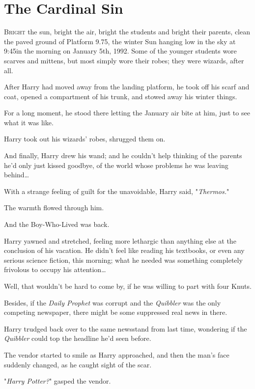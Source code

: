 \chapter{The Cardinal Sin}

\lettrine{B}{right} the sun, 
bright the air, bright the students and bright their parents, clean the paved 
ground of Platform 9.75, the winter Sun hanging low in the sky at 9:45\AM in the 
morning on January 5th, 1992. Some of the younger students wore scarves and 
mittens, but most simply wore their robes; they were wizards, after all.

After Harry had moved away from the landing platform, he took off his scarf and 
coat, opened a compartment of his trunk, and stowed away his winter things.

For a long moment, he stood there letting the January air bite at him, just to 
see what it was like.

Harry took out his wizards' robes, shrugged them on.

And finally, Harry drew his wand; and he couldn't help thinking of the parents 
he'd only just kissed goodbye, of the world whose problems he was leaving 
behind{\ldots}

With a strange feeling of guilt for the unavoidable, Harry said, 
"\emph{Thermos.}"

The warmth flowed through him.

And the Boy-Who-Lived was back.

Harry yawned and stretched, feeling more lethargic than anything else at the 
conclusion of his vacation. He didn't feel like reading his textbooks, or even 
any serious science fiction, this morning; what he needed was something 
completely frivolous to occupy his attention{\ldots}

Well, that wouldn't be hard to come by, if he was willing to part with four 
Knuts.

Besides, if the \emph{Daily Prophet} was corrupt and the \emph{Quibbler} was 
the only competing newspaper, there might be some suppressed real news in there.

Harry trudged back over to the same newsstand from last time, wondering if the 
\emph{Quibbler} could top the headline he'd seen before.

The vendor started to smile as Harry approached, and then the man's face 
suddenly changed, as he caught sight of the scar.

"\emph{Harry Potter?}" gasped the vendor.


